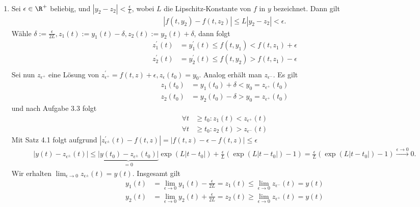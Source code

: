\begin{solution}
\leavevmode \\
\begin{enumerate}[label = \textbf{\alph*)}]
\item
  Sei $\epsilon \in \R^+$ beliebig,
  und $|y_2 - z_2| < \frac{\epsilon}{L}$, wobei
  $L$ die Lipschitz-Konstante von $f$ in $y$ bezeichnet.
  Dann gilt
  \begin{align*}
    |f(t,y_2) - f(t,z_2)| \leq L |y_2 - z_2| < \epsilon.
  \end{align*}
  Wähle $\delta := \frac{\epsilon}{2L}, z_1(t) := y_1(t) - \delta, z_2(t) := y_2(t) + \delta$, dann folgt
  \begin{align*}
    z_1^{\prime}(t) &= y_1^{\prime}(t) \leq f(t,y_1) < f(t,z_1) + \epsilon \\
    z_2^{\prime}(t) &= y_2^{\prime}(t) \leq f(t,y_2) > f(t,z_1) - \epsilon \\
  \end{align*}
  Sei nun $z_{\epsilon^+}$ eine Lösung von $z_{\epsilon^+}^{\prime} = f(t,z) + \epsilon, z_{\epsilon}(t_0) = y_0$.
  Analog erhält man $z_{\epsilon^-}$.
  Es gilt
  \begin{align*}
    z_1(t_0) &= y_1(t_0) + \delta < y_0 = z_{\epsilon^+}(t_0) \\
    z_2(t_0) &= y_2(t_0) - \delta > y_0 = z_{\epsilon^+}(t_0)
  \end{align*}
  und nach Aufgabe 3.3 folgt
  \begin{align*}
    \forall t &\geq t_0: z_1(t) < z_{\epsilon^+}(t) \\
    \forall t &\geq t_0: z_2(t) > z_{\epsilon^-}(t)
  \end{align*}
  Mit Satz 4.1 folgt aufgrund $|z_{\epsilon^{\pm}}^{\prime}(t) - f(t,z)| = |f(t,z) - \epsilon - f(t,z)| \leq \epsilon$
  \begin{align*}
  |y(t) - z_{\epsilon^{\pm}}(t)| \leq \underbrace{|y(t_0) - z_{\epsilon^{\pm}}(t_0)|}_{=0}\exp(L|t - t_0|) + \frac{\epsilon}{L}\left(\exp(L|t-t_0|) - 1\right)
  = \frac{\epsilon}{L}\left(\exp(L|t-t_0|) - 1\right)
  \stackrel{\epsilon \to 0}{\longrightarrow} 0.
  \end{align*}
  Wir erhalten $\lim_{\epsilon \to 0} z_{\epsilon^{\pm}}(t) = y(t)$. Insgesamt gilt
  \begin{align*}
    y_1(t) &= \lim_{\epsilon \to 0}y_1(t) - \frac{\epsilon}{2L} = z_1(t) \leq \lim_{\epsilon \to 0} z_{\epsilon^-}(t) = y(t) \\
    y_2(t) &= \lim_{\epsilon \to 0}y_2(t) + \frac{\epsilon}{2L} = z_2(t) \geq \lim_{\epsilon \to 0} z_{\epsilon^+}(t) = y(t)

\end{align*}
\end{enumerate}
\end{solution}
